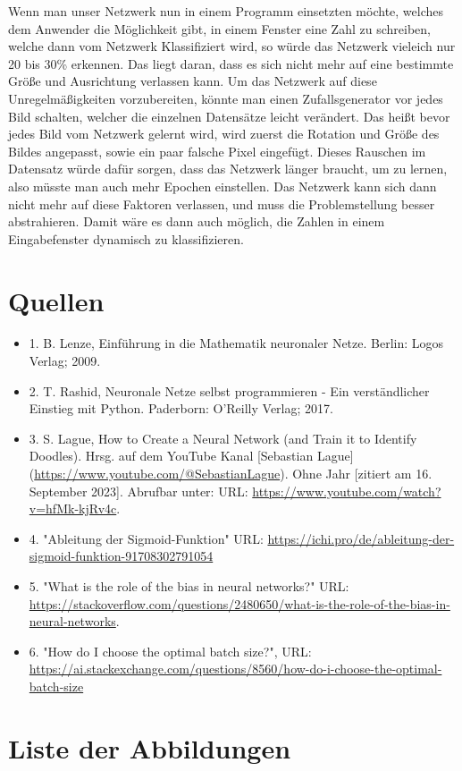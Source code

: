 \documentclass[12pt]{article}
\begin{document}
Wenn man unser Netzwerk nun in einem Programm einsetzten möchte, welches dem Anwender die Möglichkeit gibt, in einem Fenster eine Zahl zu schreiben, welche dann vom Netzwerk Klassifiziert wird, so würde das Netzwerk vieleich nur 20 bis 30\% erkennen. Das liegt daran, dass es sich nicht mehr auf eine bestimmte Größe und Ausrichtung verlassen kann. Um das Netzwerk auf diese Unregelmäßigkeiten vorzubereiten, könnte man einen Zufallsgenerator vor jedes Bild schalten, welcher die einzelnen Datensätze leicht verändert. Das heißt bevor jedes Bild vom Netzwerk gelernt wird, wird zuerst die Rotation und Größe des Bildes angepasst, sowie ein paar falsche Pixel eingefügt. Dieses Rauschen im Datensatz würde dafür sorgen, dass das Netzwerk länger braucht, um zu lernen, also müsste man auch mehr Epochen einstellen. Das Netzwerk kann sich dann nicht mehr auf diese Faktoren verlassen, und muss die Problemstellung besser abstrahieren. Damit wäre es dann auch möglich, die Zahlen in einem Eingabefenster dynamisch zu klassifizieren.\\


\cleardoublepage
\sloppy
\section{Quellen}
\begin{itemize}
\item 1. B. Lenze, Einführung in die Mathematik neuronaler Netze. Berlin: Logos Verlag; 2009.
\item 2. T. Rashid, Neuronale Netze selbst programmieren - Ein verständlicher Einstieg mit Python. Paderborn: O’Reilly Verlag; 2017.
\item 3. S. Lague, How to Create a Neural Network (and Train it to Identify Doodles). Hrsg. auf dem YouTube Kanal [Sebastian Lague](\url{https://www.youtube.com/@SebastianLague}). Ohne Jahr [zitiert am 16. September 2023]. Abrufbar unter: URL: \url{https://www.youtube.com/watch?v=hfMk-kjRv4c}.
\item 4. "Ableitung der Sigmoid-Funktion" URL: \url{https://ichi.pro/de/ableitung-der-sigmoid-funktion-91708302791054}
\item 5. "What is the role of the bias in neural networks?" URL: \url{https://stackoverflow.com/questions/2480650/what-is-the-role-of-the-bias-in-neural-networks}.
\item 6. "How do I choose the optimal batch size?", URL: \url{https://ai.stackexchange.com/questions/8560/how-do-i-choose-the-optimal-batch-size}
\end{itemize}

\cleardoublepage
\section{Liste der Abbildungen}
\listoffigures
\end{document}
